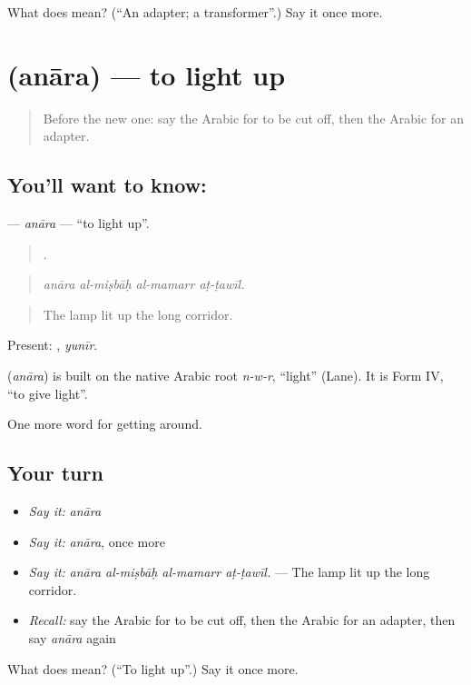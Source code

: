 \begin{tcolorbox}[breakable,colback=teal!4,colframe=teal!35!black,title={Before you move on}]
What does  mean? (\textquotedblleft{}An adapter; a transformer\textquotedblright{}.) Say it once more.
\end{tcolorbox}
\section[\texorpdfstring{\ar{أنار} (anāra)}{أنار (anāra)}]{ (anāra) — to light up}

\label{lesson:AR-C444-anara}



\begin{quote}
Before the new one: say the Arabic for to be cut off, then the Arabic for an adapter.
\end{quote}

\subsection*{You'll want to know: }
\textbf{} — \emph{anāra} — \textquotedblleft{}to light up\textquotedblright{}.

\begin{quote}
   .
\end{quote}

\begin{quote}
\emph{anāra al-miṣbāḥ al-mamarr aṭ-ṭawīl.}
\end{quote}

\begin{quote}
The lamp lit up the long corridor.
\end{quote}

Present: , \emph{yunīr}.

\begin{cousinweb}
\textbf{} (\emph{anāra}) is built on the native Arabic root \emph{n-w-r}, \textquotedblleft{}light\textquotedblright{} (Lane). It is Form IV, \textquotedblleft{}to give light\textquotedblright{}.
\end{cousinweb}

\begin{grammarlens}[title={What you've built}]
One more word for getting around.
\end{grammarlens}

\subsection*{Your turn}
\begin{itemize}
\raggedright
  \item \emph{Say it:} \emph{anāra}
  \item \emph{Say it:} \emph{anāra}, once more
  \item \emph{Say it:} \emph{anāra al-miṣbāḥ al-mamarr aṭ-ṭawīl.} — The lamp lit up the long corridor.
  \item \emph{Recall:} say the Arabic for to be cut off, then the Arabic for an adapter, then say \emph{anāra} again
\end{itemize}

\begin{tcolorbox}[breakable,colback=teal!4,colframe=teal!35!black,title={Before you move on}]
What does  mean? (\textquotedblleft{}To light up\textquotedblright{}.) Say it once more.
\end{tcolorbox}
